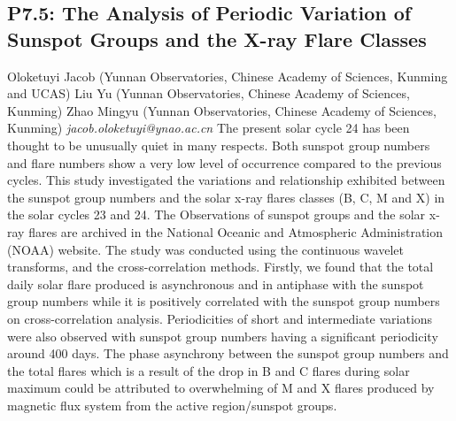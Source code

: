 \documentclass{report}
\begin{document}
\subsection*{P7.5: The Analysis of Periodic Variation of Sunspot Groups and the X-ray Flare Classes}
\bigskip
Oloketuyi Jacob (Yunnan Observatories, Chinese Academy of Sciences, Kunming and UCAS) \newline Liu Yu (Yunnan Observatories, Chinese Academy of Sciences, Kunming) \newline  Zhao Mingyu (Yunnan Observatories, Chinese Academy of Sciences, Kunming)\newline   \newline  \newline  \newline\newline
{\it jacob.oloketuyi@ynao.ac.cn}\newline
\newline\newline
The present solar cycle 24 has been thought to be unusually quiet in many respects. Both sunspot group numbers and flare numbers show a very low level of occurrence compared to the previous cycles. This study investigated the variations and relationship exhibited between the sunspot group numbers and the solar x-ray flares classes (B, C, M and X) in the solar cycles 23 and 24. The Observations of sunspot groups and the solar x-ray flares are archived in the National Oceanic and Atmospheric Administration (NOAA) website. The study was conducted using the continuous wavelet transforms, and the cross-correlation methods. Firstly, we found that the total daily solar flare produced is asynchronous and in antiphase with the sunspot group numbers while it is positively correlated with the sunspot group numbers on cross-correlation analysis. Periodicities of short and intermediate variations were also observed with sunspot group numbers having a significant periodicity around 400 days. The phase asynchrony between the sunspot group numbers and the total flares which is a result of the drop in B and C flares during solar maximum could be attributed to overwhelming of M and X flares produced by magnetic flux system from the active region/sunspot groups.\newline
\newpage
\end{document}
